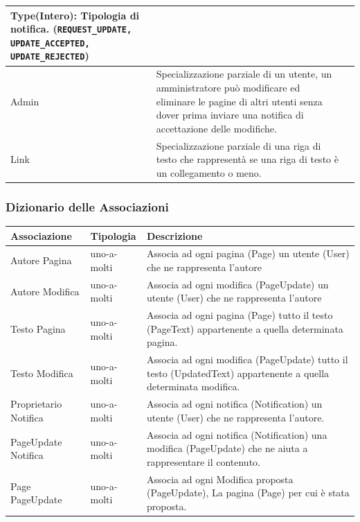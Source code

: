 \documentclass{article}
\begin{document}
\begin{table}[H]
\begin{tabularx}{\textwidth}{|l|X|X|}
				\textbf{Type}(Intero): Tipologia di notifica. (\texttt{REQUEST\_UPDATE, UPDATE\_ACCEPTED, UPDATE\_REJECTED})
				\\
				\hline
				Admin & Specializzazione parziale di un utente, un amministratore pu\`o modificare ed eliminare le pagine di altri utenti senza dover prima inviare una notifica di accettazione delle modifiche.& 
				\\
				\hline
				Link & Specializzazione parziale di una riga di testo che rappresent\`a se una riga di testo \`e un collegamento o meno.& 
				\\
				\hline
				
			\end{tabularx}
			
		\end{table}
		
		{\subsubsection{Dizionario delle Associazioni}}
		
		\begin{table}[H]
			\centering
			\small %
			\setlength{\tabcolsep}{6pt} %
			\renewcommand{\arraystretch}{1.2} %
			
			
			\begin{tabularx}{\textwidth}{|l|l|X|}
				\hline
				\textbf{Associazione} &\textbf{Tipologia}  & \textbf{Descrizione} \\
				\hline
				Autore Pagina & uno-a-molti  & Associa ad ogni pagina (Page) un utente (User) che ne rappresenta l'autore
				\\
				\hline
				Autore Modifica & uno-a-molti  & Associa ad ogni modifica (PageUpdate) un utente (User) che ne rappresenta l'autore
				\\
				\hline
				Testo Pagina & uno-a-molti  & Associa ad ogni pagina (Page) tutto il testo (PageText) appartenente a quella determinata pagina.
				\\
				\hline
				Testo Modifica & uno-a-molti  & Associa ad ogni modifica (PageUpdate) tutto il testo (UpdatedText) appartenente a quella determinata modifica.
				\\
				\hline
				Proprietario Notifica & uno-a-molti  & Associa ad ogni notifica (Notification) un utente (User) che ne rappresenta l'autore.
				\\
				\hline
				PageUpdate Notifica & uno-a-molti  & Associa ad ogni notifica (Notification) una modifica (PageUpdate) che ne aiuta a rappresentare il contenuto.
				\\
				\hline
				Page PageUpdate & uno-a-molti  & Associa ad ogni Modifica proposta (PageUpdate), La pagina (Page) per cui \`e stata proposta. 
				\\
				\hline
			\end{tabularx}
			
			
			
		\end{table}
		
\end{document}
